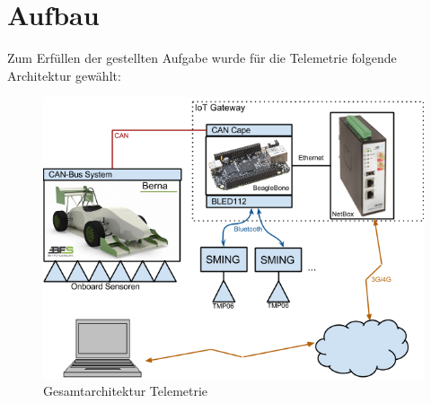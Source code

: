 \chapter{Aufbau}
\label{chap:aufbau}

Zum Erfüllen der gestellten Aufgabe wurde für die Telemetrie folgende Architektur gewählt:


\begin{figure}[hbtp]
    \center
    \includegraphics[width=\textwidth]{bilder/gesamtarchitektur.png}
    \caption{Gesamtarchitektur Telemetrie}
    \label{fig:gesamtarchitektur_telemetrie}
\end{figure}

